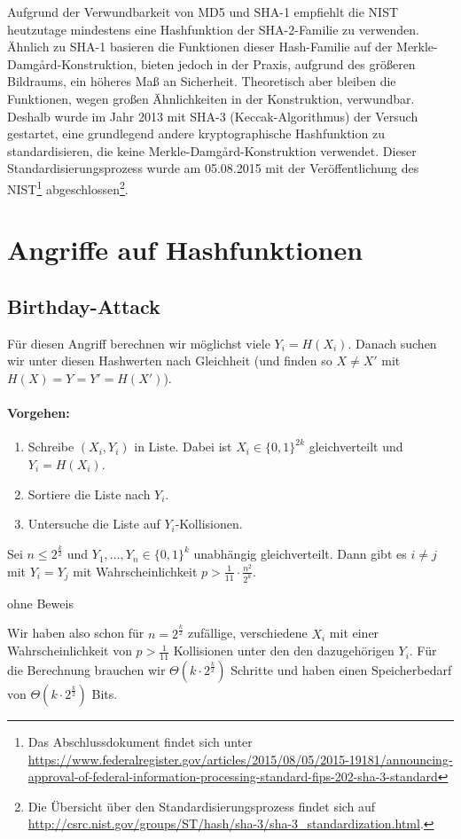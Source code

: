 Aufgrund der Verwundbarkeit von MD5 und SHA-1 empfiehlt die NIST
heutzutage mindestens eine Hashfunktion der SHA-2-Familie \indexSHATwo zu
verwenden. Ähnlich zu SHA-1 basieren die Funktionen dieser Hash-Familie
auf der Merkle-Damgård-Konstruktion, bieten jedoch in der Praxis,
aufgrund des größeren Bildraums, ein höheres Maß an
Sicherheit. Theoretisch aber bleiben die Funktionen, wegen großen
Ähnlichkeiten in der Konstruktion, verwundbar. Deshalb wurde im Jahr
2013 mit SHA-3 \indexSHAThree (\glqq Keccak\grqq{}-Algorithmus) der Versuch gestartet,
eine grundlegend andere kryptographische Hashfunktion zu
standardisieren, die keine Merkle-Damgård-Konstruktion verwendet. Dieser
Standardisierungsprozess wurde am 05.08.2015 mit der Veröffentlichung
des NIST\footnote{Das Abschlussdokument findet sich unter
\url{https://www.federalregister.gov/articles/2015/08/05/2015-19181/announcing-approval-of-federal-information-processing-standard-fips-202-sha-3-standard}}
abgeschlossen\footnote{Die Übersicht über den Standardisierungsprozess
findet sich auf
\url{http://csrc.nist.gov/groups/ST/hash/sha-3/sha-3_standardization.html}.}.


\section{Angriffe auf Hashfunktionen}
\subsection{Birthday-Attack}\indexBirthDayAttack
Für diesen Angriff berechnen wir möglichst viele $Y_i = H(X_i)$.
Danach suchen wir unter diesen Hashwerten nach Gleichheit (und finden so $X \not = X'$ mit $H(X) = Y = Y' = H(X')$).
\paragraph*{Vorgehen:}
\begin{enumerate}
  \item Schreibe $(X_i, Y_i)$ in Liste. Dabei ist $X_i \in \{0,1\}^{2k}$ gleichverteilt und $Y_i = H(X_i)$.
  \item Sortiere die Liste nach $Y_i$.
  \item Untersuche die Liste auf $Y_i$-Kollisionen.
\end{enumerate}

\begin{theorem}
Sei $n \leq 2^{\frac{k}{2}}$ und $Y_1, \ldots , Y_n \in \{0,1\}^k$ unabhängig gleichverteilt. Dann gibt es $i \not = j$ mit $Y_i = Y_j$ mit Wahrscheinlichkeit
$p > \frac{1}{11} \cdot \frac{n^2}{2^k}$.
\end{theorem}
\begin{beweis}
  ohne Beweis
\end{beweis}
Wir haben also schon für $n = 2^{\frac{k}{2}}$ zufällige, verschiedene $X_i$ mit einer Wahrscheinlichkeit von $p > \frac{1}{11}$ Kollisionen unter den
den dazugehörigen $Y_i$. Für die Berechnung brauchen wir $\Theta(k \cdot 2^{\frac{k}{2}})$ Schritte und haben einen Speicherbedarf von $\Theta(k \cdot
2^{\frac{k}{2}})$ Bits.

